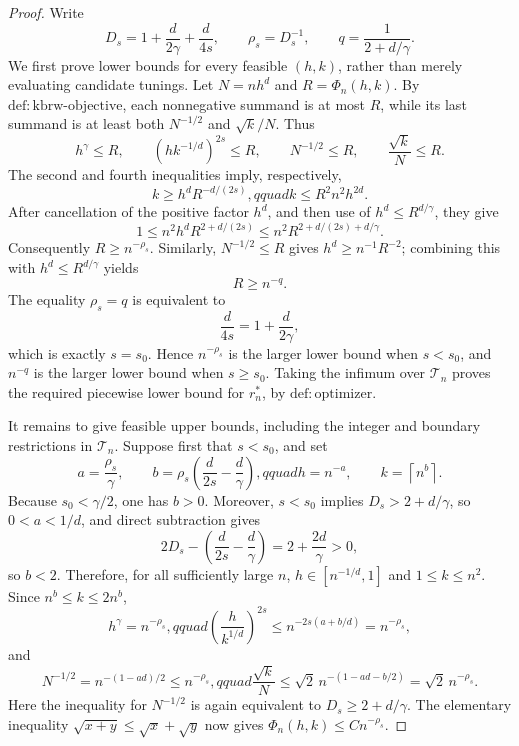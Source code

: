 \documentclass{article}
\begin{document}
\begin{proof}
Write
\[
 D_s=1+\frac{d}{2\gamma}+\frac{d}{4s},\qquad
 \rho_s=D_s^{-1},\qquad q=\frac{1}{2+d/\gamma}.
\]
We first prove lower bounds for every feasible \((h,k)\), rather than merely evaluating candidate tunings.  Let \(N=nh^d\) and \(R=\Phi_n(h,k)\).  By \(\mathrm{def:kbrw\mbox{-}objective}\), each nonnegative summand is at most \(R\), while its last summand is at least both \(N^{-1/2}\) and \(\sqrt{k}/N\).  Thus
\[
 h^\gamma\leq R,\qquad
 \left(hk^{-1/d}\right)^{2s}\leq R,\qquad
 N^{-1/2}\leq R,\qquad
 \frac{\sqrt{k}}{N}\leq R.
\]
The second and fourth inequalities imply, respectively,
\[
 k\geq h^dR^{-d/(2s)},qquad k\leq R^2n^2h^{2d}.
\]
After cancellation of the positive factor \(h^d\), and then use of \(h^d\leq R^{d/\gamma}\), they give
\[
 1\leq n^2h^dR^{2+d/(2s)}
 \leq n^2R^{2+d/(2s)+d/\gamma}.
\]
Consequently \(R\geq n^{-\rho_s}\).  Similarly, \(N^{-1/2}\leq R\) gives \(h^d\geq n^{-1}R^{-2}\); combining this with \(h^d\leq R^{d/\gamma}\) yields
\[
 R\geq n^{-q}.
\]
The equality \(\rho_s=q\) is equivalent to
\[
 \frac{d}{4s}=1+\frac{d}{2\gamma},
\]
which is exactly \(s=s_0\).  Hence \(n^{-\rho_s}\) is the larger lower bound when \(s<s_0\), and \(n^{-q}\) is the larger lower bound when \(s\geq s_0\).  Taking the infimum over \(\mathcal T_n\) proves the required piecewise lower bound for \(r_n^*\), by \(\mathrm{def:optimizer}\).

It remains to give feasible upper bounds, including the integer and boundary restrictions in \(\mathcal T_n\).  Suppose first that \(s<s_0\), and set
\[
 a=\frac{\rho_s}{\gamma},\qquad
 b=\rho_s\left(\frac{d}{2s}-\frac{d}{\gamma}\right),qquad
 h=n^{-a},\qquad k=\left\lceil n^b\right\rceil.
\]
Because \(s_0<\gamma/2\), one has \(b>0\).  Moreover, \(s<s_0\) implies \(D_s>2+d/\gamma\), so \(0<a<1/d\), and direct subtraction gives
\[
 2D_s-\left(\frac{d}{2s}-\frac{d}{\gamma}\right)=2+\frac{2d}{\gamma}>0,
\]
so \(b<2\).  Therefore, for all sufficiently large \(n\), \(h\in[n^{-1/d},1]\) and \(1\leq k\leq n^2\).  Since \(n^b\leq k\leq2n^b\),
\[
 h^\gamma=n^{-\rho_s},qquad
 \left(\frac{h}{k^{1/d}}\right)^{2s}\leq n^{-2s(a+b/d)}=n^{-\rho_s},
\]
and
\[
 N^{-1/2}=n^{-(1-ad)/2}\leq n^{-\rho_s},qquad
 \frac{\sqrt{k}}{N}\leq\sqrt2\,n^{-(1-ad-b/2)}=\sqrt2\,n^{-\rho_s}.
\]
Here the inequality for \(N^{-1/2}\) is again equivalent to \(D_s\geq2+d/\gamma\).  The elementary inequality \(\sqrt{x+y}\leq\sqrt{x}+\sqrt{y}\) now gives \(\Phi_n(h,k)\leq Cn^{-\rho_s}\).


\end{proof}
\end{document}

